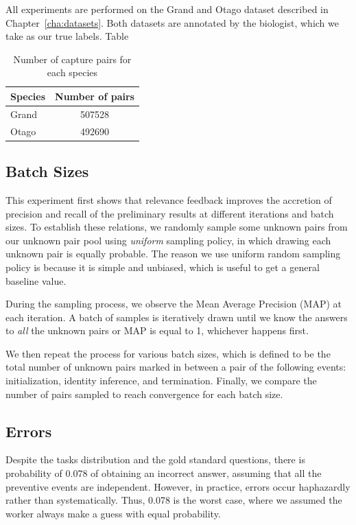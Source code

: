 All experiments are performed on the Grand and Otago dataset described in
Chapter~\ref{cha:datasets}. Both datasets are annotated by the biologist, which
we take as our true labels. Table 

\begin{table}[t]
\captionsetup{justification=centering}
  \caption{Number of capture pairs for each species}
  \label{species-num-pairs} %
  \centering
  \begin{tabular}{lc}
    \toprule
    Species & Number of pairs \\
    \midrule
    Grand & 507528 \\
    Otago & 492690 \\
    \bottomrule
  \end{tabular}
\end{table}

\subsection{Batch Sizes} %
\label{sub:batch_sizes}

This experiment first shows that relevance feedback improves the accretion of
precision and recall of the preliminary results at different iterations and
batch sizes. To establish these relations, we randomly sample some unknown
pairs from our unknown pair pool using \emph{uniform} sampling policy, in which
drawing each unknown pair is equally probable. The reason we use uniform random
sampling policy is because it is simple and unbiased, which is useful to get a
general baseline value.

During the sampling process, we observe the Mean Average Precision (MAP) at
each iteration. A batch of samples is iteratively drawn until we know the
answers to \emph{all} the unknown pairs or MAP is equal to 1, whichever happens
first.

We then repeat the process for various batch sizes, which is defined to be the
total number of unknown pairs marked in between a pair of the following events:
initialization, identity inference, and termination. Finally, we compare the
number of pairs sampled to reach convergence for each batch size.

\subsection{Errors} %
\label{sub:errors}

Despite the tasks distribution and the gold standard questions, there is
probability of 0.078 of obtaining an incorrect answer, assuming that all the
preventive events are independent. However, in practice, errors occur
haphazardly rather than systematically. Thus, 0.078 is the worst case, where we
assumed the worker always make a guess with equal probability.

